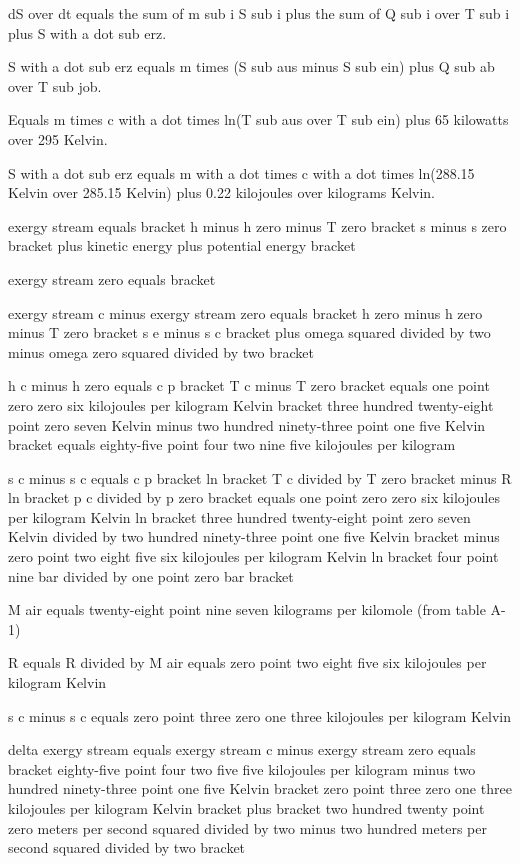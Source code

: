 dS over dt equals the sum of m sub i S sub i plus the sum of Q sub i over T sub i plus S with a dot sub erz.

S with a dot sub erz equals m times (S sub aus minus S sub ein) plus Q sub ab over T sub job.

Equals m times c with a dot times ln(T sub aus over T sub ein) plus 65 kilowatts over 295 Kelvin.

S with a dot sub erz equals m with a dot times c with a dot times ln(288.15 Kelvin over 285.15 Kelvin) plus 0.22 kilojoules over kilograms Kelvin.

exergy stream equals bracket h minus h zero minus T zero bracket s minus s zero bracket plus kinetic energy plus potential energy bracket

exergy stream zero equals bracket

exergy stream c minus exergy stream zero equals bracket h zero minus h zero minus T zero bracket s e minus s c bracket plus omega squared divided by two minus omega zero squared divided by two bracket

h c minus h zero equals c p bracket T c minus T zero bracket equals one point zero zero six kilojoules per kilogram Kelvin bracket three hundred twenty-eight point zero seven Kelvin minus two hundred ninety-three point one five Kelvin bracket equals eighty-five point four two nine five kilojoules per kilogram

s c minus s c equals c p bracket ln bracket T c divided by T zero bracket minus R ln bracket p c divided by p zero bracket equals one point zero zero six kilojoules per kilogram Kelvin ln bracket three hundred twenty-eight point zero seven Kelvin divided by two hundred ninety-three point one five Kelvin bracket minus zero point two eight five six kilojoules per kilogram Kelvin ln bracket four point nine bar divided by one point zero bar bracket

M air equals twenty-eight point nine seven kilograms per kilomole (from table A-1)

R equals R divided by M air equals zero point two eight five six kilojoules per kilogram Kelvin

s c minus s c equals zero point three zero one three kilojoules per kilogram Kelvin

delta exergy stream equals exergy stream c minus exergy stream zero equals bracket eighty-five point four two five five kilojoules per kilogram minus two hundred ninety-three point one five Kelvin bracket zero point three zero one three kilojoules per kilogram Kelvin bracket plus bracket two hundred twenty point zero meters per second squared divided by two minus two hundred meters per second squared divided by two bracket

